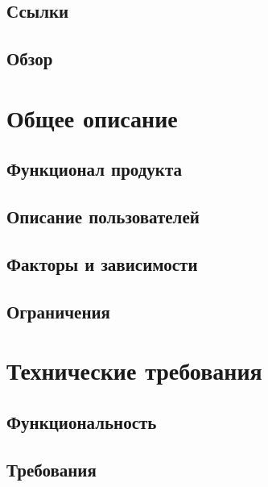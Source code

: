 \documentclass{article}
\begin{document}
\subsection{Ссылки}


\subsection{Обзор}


\section{Общее описание}

\subsection{Функционал продукта}


\subsection{Описание пользователей}


\subsection{Факторы и зависимости}


\subsection{Ограничения}


\section{Технические требования}

\subsection{Функциональность}


\subsection{Требования}

\end{document}

